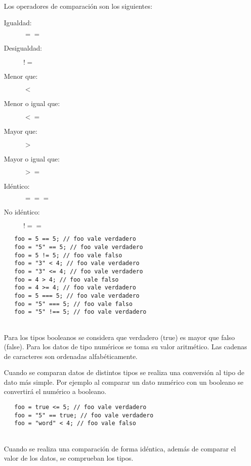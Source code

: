Los operadores de comparación son los siguientes:

\begin{description}
\item [Igualdad:] $==$
\item [Desigualdad:] $!=$
\item [Menor que:] $<$
\item [Menor o igual que:] $<=$
\item [Mayor que:] $>$
\item [Mayor o igual que:] $>=$
\item [Idéntico:] $===$
\item [No idéntico:] $!==$
\end{description} 


\begin{lstlisting}
   foo = 5 == 5; // foo vale verdadero
   foo = "5" == 5; // foo vale verdadero
   foo = 5 != 5; // foo vale falso
   foo = "3" < 4; // foo vale verdadero
   foo = "3" <= 4; // foo vale verdadero
   foo = 4 > 4; // foo vale falso
   foo = 4 >= 4; // foo vale verdadero
   foo = 5 === 5; // foo vale verdadero
   foo = "5" === 5; // foo vale falso
   foo = "5" !== 5; // foo vale verdadero
\end{lstlisting} 
\hfill\\

Para los tipos booleanos se considera que verdadero (true) es mayor que falso (false). Para los datos de tipo numéricos se toma su valor aritmético.
Las cadenas de caracteres son ordenadas alfabéticamente.

Cuando se comparan datos de distintos tipos se realiza una conversión al tipo de dato más simple. Por ejemplo al comparar un dato numérico con un booleano se convertirá
el numérico a booleano. \\

\begin{lstlisting}
   foo = true <= 5; // foo vale verdadero
   foo = "5" == true; // foo vale verdadero
   foo = "word" < 4; // foo vale falso
\end{lstlisting} 
\hfill\\

Cuando se realiza una comparación de forma idéntica, además de comparar el valor de los datos, se comprueban los tipos.




